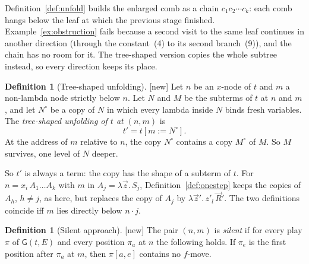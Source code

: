 \documentclass[11pt]{article}
\newcommand{\Gm}{\mathsf{G}}
\newcommand{\suc}[2]{#1{\cdot}#2}
\newcommand{\iv}[2]{\pi[#1,#2]}
\newcommand{\New}{\textsf{[new]}}
\theoremstyle{plain}
\theoremstyle{definition}
\newtheorem{definition}[theorem]{Definition}
\theoremstyle{remark}
\begin{document}
Definition~\ref{def:unfold} builds the enlarged comb as a chain
$c_1c_2\cdots c_k$: each comb hangs below the leaf at which the previous
stage finished.  Example~\ref{ex:obstruction} fails because a second
visit to the same leaf continues in another direction (through the
constant~(4) to its second branch~(9)), and the chain has no room for
it.  The tree-shaped version copies the whole subtree instead, so every
direction keeps its place.

\begin{definition}[Tree-shaped unfolding]\label{def:treeunf}
\New{} Let $n$ be an $x$-node of $t$ and $m$ a non-lambda node strictly
below $n$.  Let $N$ and $M$ be the subterms of $t$ at $n$ and $m$, and
let $N^\circ$ be a copy of $N$ in which every lambda inside $N$ binds
fresh variables.  The \emph{tree-shaped unfolding of $t$ at $(n,m)$} is
\[
t'=t[m:=N^\circ].
\]
At the address of $m$ relative to $n$, the copy $N^\circ$ contains a
copy $M^\circ$ of $M$.  So $M$ survives, one level of $N$ deeper.
\end{definition}

So $t'$ is always a term: the copy has the shape of a subterm of $t$.
For $n=x_i\,A_1\dots A_k$ with $m$ in $A_j=\lambda\vec z.\,S_j$,
Definition~\ref{def:onestep} keeps the copies of $A_h$, $h\ne j$, as
here, but replaces the copy of $A_j$ by $\lambda\vec z'.\,z'_l\,\vec R'$.
The two definitions coincide iff $m$ lies directly below $\suc nj$.

\begin{definition}[Silent approach]\label{def:silent}
\New{} The pair $(n,m)$ is \emph{silent} if for every play $\pi$ of
$\Gm(t,E)$ and every position $\pi_a$ at $n$ the following holds.  If
$\pi_e$ is the first position after $\pi_a$ at $m$, then $\iv ae$
contains no $f$-move.
\end{definition}
\end{document}
